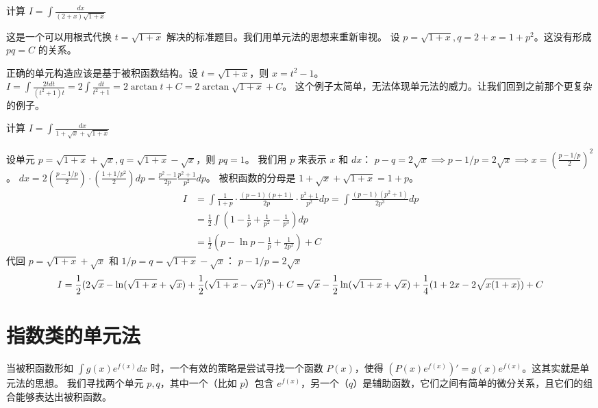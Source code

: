 \documentclass[lang=cn,newtx,10pt,scheme=chinese]{elegantbook}
\begin{document}
\begin{problem}
    计算 $I = \int \frac{dx}{(2+x)\sqrt{1+x}}$
\end{problem}
\begin{solution}
    这是一个可以用根式代换 $t=\sqrt{1+x}$ 解决的标准题目。我们用单元法的思想来重新审视。
    设 $p = \sqrt{1+x}, q = 2+x = 1+p^2$。这没有形成 $pq=C$ 的关系。
    
    正确的单元构造应该是基于被积函数结构。设 $t = \sqrt{1+x}$，则 $x=t^2-1$。
    $I = \int \frac{2t dt}{(t^2+1)t} = 2 \int \frac{dt}{t^2+1} = 2 \arctan t + C = 2\arctan\sqrt{1+x}+C$。
    这个例子太简单，无法体现单元法的威力。让我们回到之前那个更复杂的例子。

\begin{problem}
    计算 $I = \int \frac{dx}{1+\sqrt{x}+\sqrt{1+x}}$
\end{problem}
\begin{solution}
    设单元 $p=\sqrt{1+x}+\sqrt{x}, q=\sqrt{1+x}-\sqrt{x}$，则 $pq=1$。
    我们用 $p$ 来表示 $x$ 和 $dx$：
    $p-q = 2\sqrt{x} \implies p - 1/p = 2\sqrt{x} \implies x = (\frac{p-1/p}{2})^2$。
    $dx = 2(\frac{p-1/p}{2}) \cdot (\frac{1+1/p^2}{2}) dp = \frac{p^2-1}{2p} \frac{p^2+1}{p^2} dp$。
    被积函数的分母是 $1+\sqrt{x}+\sqrt{1+x} = 1+p$。
    \begin{align*}
        I &= \int \frac{1}{1+p} \cdot \frac{(p-1)(p+1)}{2p} \cdot \frac{p^2+1}{p^2} dp = \int \frac{(p-1)(p^2+1)}{2p^3} dp \\
        &= \frac{1}{2} \int (1 - \frac{1}{p} + \frac{1}{p^2} - \frac{1}{p^3}) dp \\
        &= \frac{1}{2} (p - \ln p - \frac{1}{p} + \frac{1}{2p^2}) + C
    \end{align*}
    代回 $p = \sqrt{1+x}+\sqrt{x}$ 和 $1/p = q = \sqrt{1+x}-\sqrt{x}$：
    $p-1/p = 2\sqrt{x}$
    \begin{equation*}
        I = \frac{1}{2} (2\sqrt{x} - \ln(\sqrt{1+x}+\sqrt{x}) + \frac{1}{2}(\sqrt{1+x}-\sqrt{x})^2) + C \\
        = \sqrt{x} - \frac{1}{2}\ln(\sqrt{1+x}+\sqrt{x}) + \frac{1}{4}(1+2x-2\sqrt{x(1+x)}) + C
    \end{equation*}
\end{solution}

\section{指数类的单元法}
当被积函数形如 $\int g(x) e^{f(x)} dx$ 时，一个有效的策略是尝试寻找一个函数 $P(x)$，使得 $(P(x)e^{f(x)})' = g(x)e^{f(x)}$。这其实就是单元法的思想。
我们寻找两个单元 $p, q$，其中一个（比如 $p$）包含 $e^{f(x)}$，另一个（$q$）是辅助函数，它们之间有简单的微分关系，且它们的组合能够表达出被积函数。


\end{solution}
\end{document}
